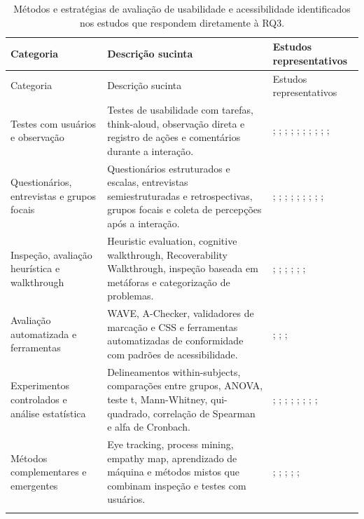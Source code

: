 \begin{longtable}{|p{3.2cm}|p{6cm}|p{5.8cm}|}
\hline
Categoria & Descrição sucinta & Estudos representativos \\ \hline
\endfirsthead
\hline
Categoria & Descrição sucinta & Estudos representativos \\ \hline
\endhead
\hline
\endfoot
\endlastfoot
Testes com usuários e observação &
Testes de usabilidade com tarefas, think-aloud, observação direta e registro de ações e comentários durante a interação. &
\cite{secure_messaging}; \cite{xie2010usability}; \cite{patsoule2012redesigning}; \cite{gatsou2017seniors}; \cite{ro2024usability}; \cite{sharit2008information}; \cite{arfaa2015usability}; \cite{finn2013usability}; \cite{lum2016development}; \cite{kymäläinen2012creating}; \cite{almahmud2022developing} \\ \hline
Questionários, entrevistas e grupos focais &
Questionários estruturados e escalas, entrevistas semiestruturadas e retrospectivas, grupos focais e coleta de percepções após a interação. &
\cite{secure_messaging}; \cite{ko2019old}; \cite{nosseir2011novice}; \cite{breaking_barriers}; \cite{sustar2008requirements}; \cite{finn2013usability}; \cite{kymäläinen2012creating}; \cite{almahmud2022developing}; \cite{crabb2014age}; \cite{delara2016study} \\ \hline
Inspeção, avaliação heurística e walkthrough &
Heuristic evaluation, cognitive walkthrough, Recoverability Walkthrough, inspeção baseada em metáforas e categorização de problemas. &
\cite{patsoule2012redesigning}; \cite{kurniawan2005research}; \cite{hart2008evaluating}; \cite{filgueiras2009recoverability}; \cite{hornbaek2004usability}; \cite{skov2009conceptual}; \cite{lindberg2021towards} \\ \hline
Avaliação automatizada e ferramentas &
WAVE, A-Checker, validadores de marcação e CSS e ferramentas automatizadas de conformidade com padrões de acessibilidade. &
\cite{kouroupetroglou2016methodological}; \cite{chiriboga2025accessible}; \cite{mowar2025codea11y}; \cite{sadeghi2020hci} \\ \hline
Experimentos controlados e análise estatística &
Delineamentos within-subjects, comparações entre grupos, ANOVA, teste t, Mann-Whitney, qui-quadrado, correlação de Spearman e alfa de Cronbach. &
\cite{zaphiris2003age}; \cite{ko2019old}; \cite{artis2006effects}; \cite{vaughan2006why}; \cite{arfaa2015usability}; \cite{romano2013age}; \cite{sharit2008information}; \cite{crabb2014age}; \cite{cowan2011exploring} \\ \hline
Métodos complementares e emergentes &
Eye tracking, process mining, empathy map, aprendizado de máquina e métodos mistos que combinam inspeção e testes com usuários. &
\cite{romano2013age}; \cite{taylor2009using}; \cite{allah2021empathy}; \cite{sadeghi2020hci}; \cite{balakrishnan2012user}; \cite{kanjanakuha2019comprehensibility} \\ \hline
\caption{Métodos e estratégias de avaliação de usabilidade e acessibilidade identificados nos estudos que respondem diretamente à RQ3.}
\label{tab:metodosRQ3}
\end{longtable}